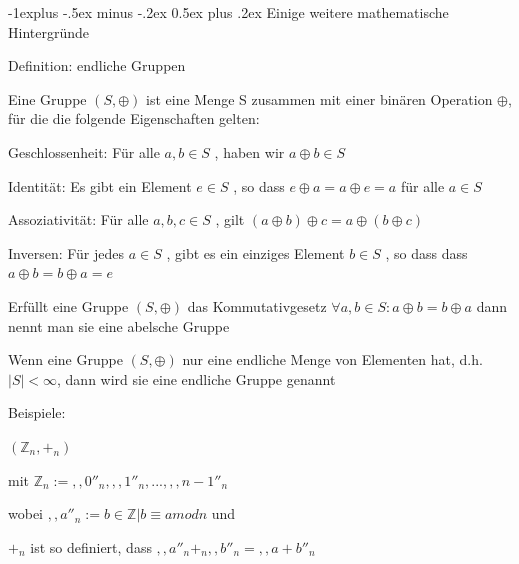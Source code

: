 \documentclass[a4paper]{article}
\makeatletter
\renewcommand{\subsection}{\@startsection{subsection}{2}{0mm}%
 {-1explus -.5ex minus -.2ex}%
 {0.5ex plus .2ex}%
 {\normalfont\normalsize\bfseries}}
\makeatother
\begin{document}
\begin{multicols}{3}
      \subsection{Einige weitere mathematische Hintergründe}
      \begin{itemize*}
            \item Definition: endliche Gruppen
            \begin{itemize*}
                  \item Eine Gruppe $( S , \oplus)$ ist eine Menge S zusammen mit einer binären Operation $\oplus$, für die die folgende Eigenschaften gelten:
                  \begin{itemize*}
                        \item Geschlossenheit: Für alle $a, b \in S$ , haben wir $a \oplus b \in S$
                        \item Identität: Es gibt ein Element $e \in S$ , so dass $e \oplus a = a \oplus e = a$ für alle $a \in S$
                        \item Assoziativität: Für alle $a, b, c \in S$ , gilt $( a \oplus b ) \oplus c = a \oplus ( b \oplus c )$
                        \item Inversen: Für jedes $a \in S$ , gibt es ein einziges Element $b \in S$ , so dass dass $a \oplus b = b \oplus a = e$
                  \end{itemize*}
                  \item Erfüllt eine Gruppe $( S , \oplus)$ das Kommutativgesetz $\forall a, b \in S : a \oplus b = b \oplus a$ dann nennt man sie eine abelsche Gruppe
                  \item Wenn eine Gruppe $( S , \oplus)$ nur eine endliche Menge von Elementen hat, d.h. $|S| < \infty$, dann wird sie eine endliche Gruppe genannt
            \end{itemize*}
            \item Beispiele:
            \begin{itemize*}
                  \item $(\mathbb{Z}_n , +_n)$
                  \begin{itemize*}
                        \item mit $\mathbb{Z}_n:={,,0''_n,,,1''_n,...,,,n-1''_n}$
                        \item wobei $,,a''_n:={b \in \mathbb{Z} | b \equiv a mod n}$ und
                        \item $+_n$ ist so definiert, dass $,,a''_n+_n,,b''_n=,,a+b''_n$

\end{itemize*}
\end{itemize*}
\end{itemize*}
\end{multicols}
\end{document}
